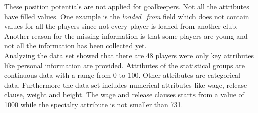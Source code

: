 \documentclass[runningheads]{llncs}
\begin{document}
These position potentials are not applied for goalkeepers.
Not all the attributes have filled values. One example is the \textit{loaded\_from} field which does not contain values for all the players since not every player is loaned from another club. Another reason for the missing information is that some players are young and not all the information has been collected yet. \\
Analyzing the data set showed that there are 48 players were only key attributes like personal information are provided. 
Attributes of the statistical groups are continuous data with a range from 0 to 100. Other attributes are categorical data. Furthermore the data set includes numerical attributes like wage, release clause, weight and height.
The wage and release clauses starts from a value of 1000 while the specialty attribute is not smaller than 731.



\newpage
%
%
\end{document}

